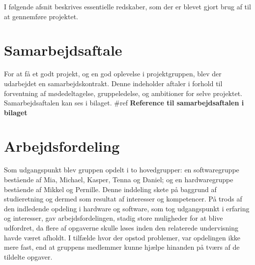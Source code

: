 I følgende afsnit beskrives essentielle redskaber, som der er blevet gjort brug af til at gennemføre projektet. 



\section{Samarbejdsaftale}
For at få et godt projekt, og en god oplevelse i projektgruppen, blev der udarbejdet en samarbejdskontrakt. Denne indeholder aftaler i forhold til forventning af mødedeltagelse, gruppeledelse, og ambitioner for selve projektet. Samarbejdsaftalen kan ses i bilaget. \#ref \textbf{Reference til samarbejdsaftalen i bilaget}


\section{Arbejdsfordeling}
Som udgangspunkt blev gruppen opdelt i to hovedgrupper: en softwaregruppe bestående af Mia, Michael, Kasper, Tenna og Daniel; og en hardwaregruppe bestående af Mikkel og Pernille. Denne inddeling skete på baggrund af studieretning og dermed som resultat af interesser og kompetencer. På trods af den indledende opdeling i hardware og software, som tog udgangspunkt i erfaring og interesser, gav arbejdsfordelingen, stadig store muligheder for at blive udfordret, da flere af opgaverne skulle løses inden den relaterede undervisning havde været afholdt. I tilfælde hvor der opstod problemer, var opdelingen ikke mere fast, end at gruppens medlemmer kunne hjælpe hinanden på tværs af de tildelte opgaver. \\

